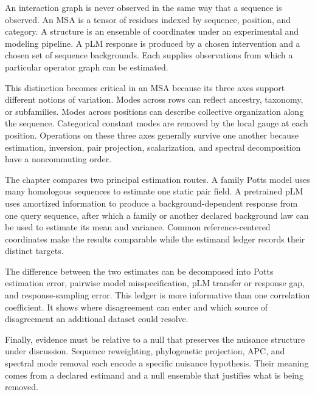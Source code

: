 An interaction graph is never observed in the same way that a sequence is observed.  An MSA is a
tensor of residues indexed by sequence, position, and category.  A structure is an ensemble of
coordinates under an experimental and modeling pipeline.  A pLM response is produced by a chosen
intervention and a chosen set of sequence backgrounds.  Each supplies observations from which a
particular operator graph can be estimated.

This distinction becomes critical in an MSA because its three axes support different notions of
variation.  Modes across rows can reflect ancestry, taxonomy, or subfamilies.  Modes across
positions can describe collective organization along the sequence.  Categorical constant modes
are removed by the local gauge at each position.  Operations on these three axes generally survive
one another because estimation, inversion, pair projection, scalarization, and spectral
decomposition have a noncommuting order.

The chapter compares two principal estimation routes.  A family Potts model uses many homologous
sequences to estimate one static pair field.  A pretrained pLM uses amortized information to
produce a background-dependent response from one query sequence, after which a family or another
declared background law can be used to estimate its mean and variance.  Common reference-centered
coordinates make the results comparable while the estimand ledger records their distinct targets.

The difference between the two estimates can be decomposed into Potts estimation error, pairwise
model misspecification, pLM transfer or response gap, and response-sampling error.  This ledger is
more informative than one correlation coefficient.  It shows where disagreement can enter and
which source of disagreement an additional dataset could resolve.

Finally, evidence must be relative to a null that preserves the nuisance structure under
discussion.  Sequence reweighting, phylogenetic projection, APC, and spectral mode removal each
encode a specific nuisance hypothesis.  Their meaning comes from a declared estimand and a null
ensemble that justifies what is being removed.
